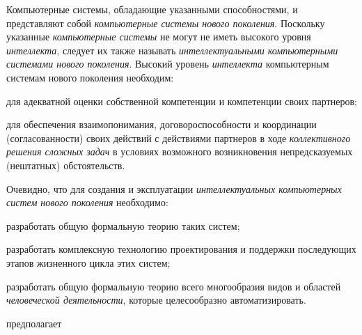Компьютерные системы, обладающие указанными способностями, и представляют собой \textit{компьютерные системы нового поколения}. Поскольку указанные \textit{компьютерные системы} не могут не иметь высокого уровня \textit{интеллекта}, следует их также называть \textit{интеллектуальными компьютерными системами нового поколения}. Высокий уровень \textit{интеллекта} компьютерным системам нового поколения необходим:
\begin{textitemize}
	\item для адекватной оценки собственной компетенции и компетенции своих партнеров;
	\item для обеспечения взаимопонимания, договороспособности и координации (согласованности) своих действий с действиями партнеров в ходе \textit{коллективного решения сложных задач} в условиях возможного возникновения непредсказуемых (нештатных) обстоятельств.
\end{textitemize}

Очевидно, что для создания и эксплуатации \textit{интеллектуальных компьютерных систем нового поколения} необходимо:
\begin{textitemize}
	\item разработать общую формальную теорию таких систем;
	\item разработать комплексную технологию проектирования и поддержки последующих этапов жизненного цикла этих систем;
	\item разработать общую формальную теорию всего многообразия видов и областей \textit{человеческой деятельности}, которые целесообразно автоматизировать.
\end{textitemize}

\begin{SCn}
	\begin{scnrelfromlist}{предполагает}
	\end{scnrelfromlist}
\end{SCn}

